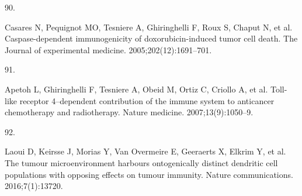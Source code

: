 \documentclass[
]{article}
\newlength{\cslhangindent}
\newlength{\csllabelwidth}
\newenvironment{CSLReferences}[2] %
 {\begin{list}{}{%
  \setlength{\itemindent}{0pt}
  \setlength{\leftmargin}{0pt}
  \setlength{\parsep}{0pt}
  \ifodd #1
   \setlength{\leftmargin}{\cslhangindent}
   \setlength{\itemindent}{-1\cslhangindent}
  \fi
  \setlength{\itemsep}{#2\baselineskip}}}
 {\end{list}}
\newcommand{\CSLLeftMargin}[1]{\parbox[t]{\csllabelwidth}{\strut#1\strut}}
\newcommand{\CSLRightInline}[1]{\parbox[t]{\linewidth - \csllabelwidth}{\strut#1\strut}}
\begin{document}
\begin{CSLReferences}{0}{1}
\CSLLeftMargin{90. }%
\CSLRightInline{Casares N, Pequignot MO, Tesniere A, Ghiringhelli F,
Roux S, Chaput N, et al. Caspase-dependent immunogenicity of
doxorubicin-induced tumor cell death. The Journal of experimental
medicine. 2005;202(12):1691--701. }

\CSLLeftMargin{91. }%
\CSLRightInline{Apetoh L, Ghiringhelli F, Tesniere A, Obeid M, Ortiz C,
Criollo A, et al. Toll-like receptor 4--dependent contribution of the
immune system to anticancer chemotherapy and radiotherapy. Nature
medicine. 2007;13(9):1050--9. }

\CSLLeftMargin{92. }%
\CSLRightInline{Laoui D, Keirsse J, Morias Y, Van Overmeire E, Geeraerts
X, Elkrim Y, et al. The tumour microenvironment harbours ontogenically
distinct dendritic cell populations with opposing effects on tumour
immunity. Nature communications. 2016;7(1):13720. }

\end{CSLReferences}
\end{document}
